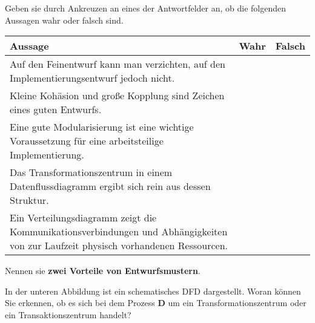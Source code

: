 \documentclass[12pt]{exam}
\begin{document}
\begin{questions}

\question[5] Geben sie durch Ankreuzen an eines der Antwortfelder an, ob die folgenden Aussagen wahr oder falsch sind. \\
\addpoints
\begin{tabular}{| p{12cm} | c | c |} \hline
\textbf{Aussage} & \textbf{Wahr} & \textbf{Falsch} \\ \hline
Auf den Feinentwurf kann man verzichten, auf den Implementierungsentwurf jedoch nicht. & & \\ \hline
Kleine Kohäsion und große Kopplung sind Zeichen eines guten Entwurfs. & & \\ \hline
Eine gute Modularisierung ist eine wichtige Voraussetzung für eine arbeitsteilige Implementierung. & & \\ \hline
Das Transformationszentrum in einem Datenflussdiagramm ergibt sich rein aus dessen Struktur. & & \\ \hline
Ein Verteilungsdiagramm zeigt die Kommunikationsverbindungen und Abhängigkeiten von zur Laufzeit physisch vorhandenen Ressourcen. & & \\ \hline
\end{tabular}

\question[2] Nennen sie \textbf{zwei Vorteile von Entwurfsmustern}.
\addpoints

\question[2] In der unteren Abbildung ist ein schematisches DFD dargestellt. Woran können Sie erkennen, ob es sich bei dem Prozess \textbf{D} um ein Transformationszentrum oder ein Transaktionszentrum handelt? \\
\addpoints
{}
\end{questions}
\end{document}
